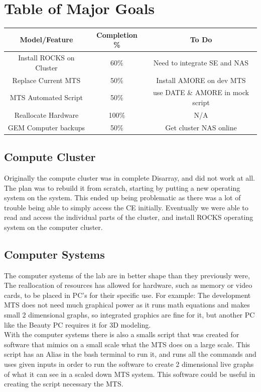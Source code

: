 \documentclass[12pt]{article}
\newcommand\tab[1][1cm]{\hspace*{#1}}
\begin{document}
\section{Table of Major Goals}
\begin{tabular}{|c|c|c|}
	\hline
	Model/Feature & Completion \% & To Do \\
	\hline
	Install ROCKS on Cluster & 60\% & Need to integrate SE and NAS \\
	\hline
	Replace Current MTS & 50\% & Install AMORE on dev MTS \\
	\hline
	MTS Automated Script & 50\% & use DATE \& AMORE in mock script \\
	\hline
	Reallocate Hardware & 100\% & N/A \\
	\hline
	GEM Computer backups & 50\% & Get cluster NAS online \\
	\hline
	
\end{tabular}
\subsection{Compute Cluster}
\tab Originally the compute cluster was in complete Disarray, and did not work at all. The plan was to rebuild it from scratch, starting by putting a new operating system on the system. This ended up being problematic as there was a lot of trouble being able to simply access the CE initially. Eventually we were able to read and access the individual parts of the cluster, and install ROCKS operating system on the computer cluster. 
\subsection{Computer Systems}
\tab The computer systems of the lab are in better shape than they previously were, The reallocation of resources has allowed for hardware, such as memory or video cards, to be placed in PC's for their specific use. For example: The development MTS does not need much graphical power as it runs math equations and makes small 2 dimensional graphs, so integrated graphics are fine for it, but another PC like the Beauty PC requires it for 3D modeling. \\
\tab With the computer systems there is also a smalls script that was created for software that mimics on a small scale what the MTS does on a large scale. This script has an Alias in the bash terminal to run it, and runs all the commands and uses given inputs in order to run the software to create 2 dimensional live graphs of what it can see in a scaled down MTS system. This software could be useful in creating the script necessary the MTS.
\end{document}
